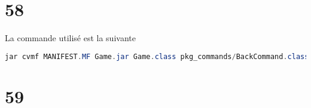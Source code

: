 \documentclass[a4paper , 10pt]{article}
\begin{document}
\section{58}
La commande utilisé est la suivante
\begin{lstlisting}[language=Java, caption={pkg\_commands}]
jar cvmf MANIFEST.MF Game.jar Game.class pkg_commands/BackCommand.class pkg_commands/BeamCommand.class pkg_commands/DropCommand.class pkg_commands/EatCommand.class pkg_commands/GoCommand.class pkg_commands/HelpCommand.class pkg_commands/LookCommand.class pkg_commands/MineCommand.class pkg_commands/QuitCommand.class pkg_commands/TakeCommand.class pkg_commands/TestCommand.class pkg_data/Item.class pkg_data/Player.class pkg_data/Room.class pkg_mainStruct/GameModel.class pkg_mainStruct/GameView.class pkg_mainStruct/UserInterface\$1.class pkg_mainStruct/UserInterface.class pkg_tools/Command.class pkg_tools/CommandWord.class pkg_tools/CommandWords.class pkg_tools/Parser.class pkg_tools/RoomFileReader.class img/* cmd.txt explore_all.txt RoomData.csv ideal_run.txt 

\end{lstlisting}

\section{59}
\end{document}
